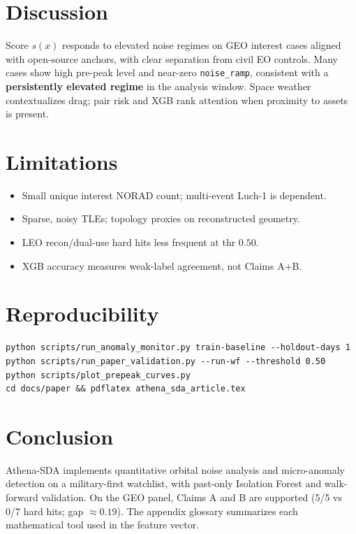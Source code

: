 \documentclass[11pt,a4paper]{article}
\begin{document}
\section{Discussion}
\label{sec:discussion}

Score \(s(x)\) responds to elevated noise regimes on GEO interest cases aligned with open-source anchors, with clear separation from civil EO controls.
Many cases show high pre-peak level and near-zero \texttt{noise\_ramp}, consistent with a \textbf{persistently elevated regime} in the analysis window.
Space weather contextualizes drag; pair risk and XGB rank attention when proximity to assets is present.

\section{Limitations}
\label{sec:limits}

\begin{itemize}[leftmargin=*]
  \item Small unique interest NORAD count; multi-event Luch-1 is dependent.
  \item Sparse, noisy TLEs; topology proxies on reconstructed geometry.
  \item LEO recon/dual-use hard hits less frequent at thr \(0.50\).
  \item XGB accuracy measures weak-label agreement, not Claims A+B.
\end{itemize}

\section{Reproducibility}
\label{sec:repro}

\begin{verbatim}
python scripts/run_anomaly_monitor.py train-baseline --holdout-days 1
python scripts/run_paper_validation.py --run-wf --threshold 0.50
python scripts/plot_prepeak_curves.py
cd docs/paper && pdflatex athena_sda_article.tex
\end{verbatim}

\section{Conclusion}
\label{sec:concl}

Athena-SDA implements quantitative orbital noise analysis and micro-anomaly detection on a military-first watchlist, with past-only Isolation Forest and walk-forward validation.
On the GEO panel, Claims A and B are supported (5/5 vs 0/7 hard hits; gap \(\approx 0.19\)).
The appendix glossary summarizes each mathematical tool used in the feature vector.
\end{document}
